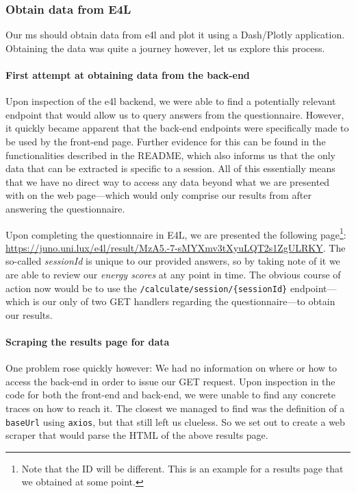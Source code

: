 \subsubsection{Obtain data from E4L}

Our \gls{ms} should obtain data from \gls{e4l} and plot it using
a Dash/Plotly application. Obtaining the data was quite a journey
however, let us explore this process.

\paragraph{First attempt at obtaining data from the back-end}

Upon inspection of the \gls{e4l} backend, we were able to find a
potentially relevant endpoint that would allow us to query answers
from the questionnaire.  However, it quickly became apparent that the
back-end endpoints were specifically made to be used by the front-end
page. Further evidence for this can be found in the functionalities
described in the README, which also informs us that the only data that
can be extracted is specific to a session. All of this essentially
means that we have no direct way to access any data beyond what we are
presented with on the web page---which would only comprise our results
from after answering the questionnaire.

Upon completing the questionnaire in E4L, we are presented the
following page\footnote{Note that the ID will be different. This is an
example for a results page that we obtained at some point.}:
\url{https://juno.uni.lux/e4l/result/MzA5.-7-sMYXmv3tXyuLQT2s1ZgULRKY}.
The so-called	\textit{sessionId} is unique to our provided answers, so
by taking note of it we are able to review our \textit{energy scores}
at any point in time. The obvious course of action now would be to use
the \verb|/calculate/session/{sessionId}| endpoint---which is our only
of two GET handlers regarding the questionnaire---to obtain our
results.

\paragraph{Scraping the results page for data}

One problem rose quickly however: We had no information on where or
how to access the back-end in order to issue our GET request. Upon
inspection in the code for both the front-end and back-end, we were
unable to find any concrete traces on how to reach it. The closest we
managed to find was the definition of a \verb|baseUrl| using \verb|axios|,
but that still left us clueless. So we set out to create a web scraper
that would parse the HTML of the above results page.


